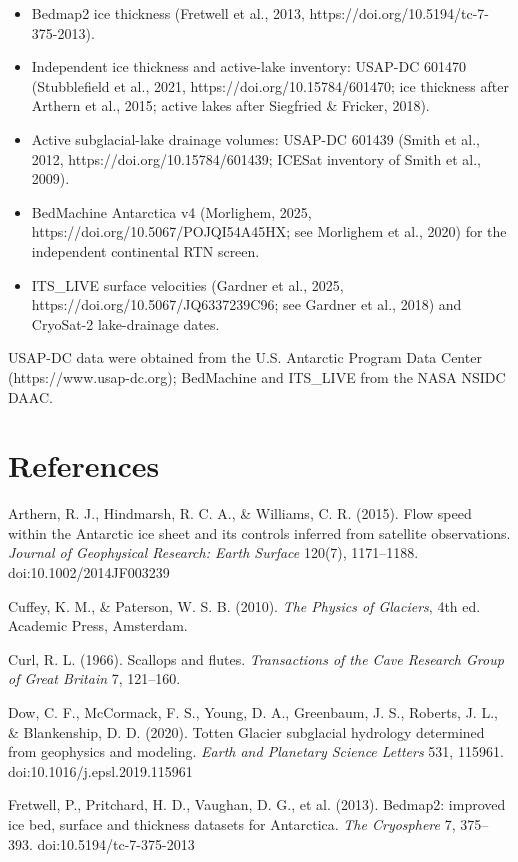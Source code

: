 \documentclass[11pt]{article}
\begin{document}
\begin{itemize}
\item Bedmap2 ice thickness (Fretwell et al., 2013, https://doi.org/10.5194/tc-7-375-2013).
\item Independent ice thickness and active-lake inventory: USAP-DC 601470 (Stubblefield et al., 2021, https://doi.org/10.15784/601470; ice thickness after Arthern et al., 2015; active lakes after Siegfried \& Fricker, 2018).
\item Active subglacial-lake drainage volumes: USAP-DC 601439 (Smith et al., 2012, https://doi.org/10.15784/601439; ICESat inventory of Smith et al., 2009).
\item BedMachine Antarctica v4 (Morlighem, 2025, https://doi.org/10.5067/POJQI54A45HX; see Morlighem et al., 2020) for the independent continental RTN screen.
\item ITS\_LIVE surface velocities (Gardner et al., 2025, https://doi.org/10.5067/JQ6337239C96; see Gardner et al., 2018) and CryoSat-2 lake-drainage dates.
\end{itemize}


USAP-DC data were obtained from the U.S. Antarctic Program Data Center (https://www.usap-dc.org); BedMachine and ITS\_LIVE from the NASA NSIDC DAAC.


\section*{References}


Arthern, R. J., Hindmarsh, R. C. A., \& Williams, C. R. (2015). Flow speed within the Antarctic ice sheet and its controls inferred from satellite observations. \emph{Journal of Geophysical Research: Earth Surface} 120(7), 1171–1188. doi:10.1002/2014JF003239


Cuffey, K. M., \& Paterson, W. S. B. (2010). \emph{The Physics of Glaciers}, 4th ed. Academic Press, Amsterdam.


Curl, R. L. (1966). Scallops and flutes. \emph{Transactions of the Cave Research Group of Great Britain} 7, 121–160.


Dow, C. F., McCormack, F. S., Young, D. A., Greenbaum, J. S., Roberts, J. L., \& Blankenship, D. D. (2020). Totten Glacier subglacial hydrology determined from geophysics and modeling. \emph{Earth and Planetary Science Letters} 531, 115961. doi:10.1016/j.epsl.2019.115961


Fretwell, P., Pritchard, H. D., Vaughan, D. G., et al. (2013). Bedmap2: improved ice bed, surface and thickness datasets for Antarctica. \emph{The Cryosphere} 7, 375–393. doi:10.5194/tc-7-375-2013
\end{document}

